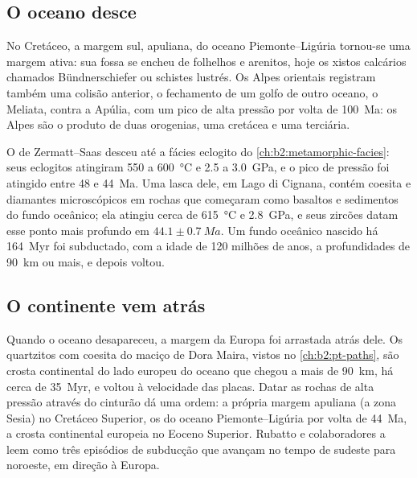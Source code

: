 \subsection*{O oceano desce}

No Cretáceo, a margem sul, apuliana, do oceano Piemonte--Ligúria tornou-se uma
margem ativa: sua fossa se encheu de folhelhos e arenitos, hoje os xistos calcários
chamados Bündnerschiefer ou schistes lustrés. Os Alpes orientais registram também uma colisão
anterior, o fechamento de um golfo de outro oceano, o Meliata, contra a Apúlia, com um
pico de alta pressão por volta de \qty{100}{Ma}: os Alpes são o produto de duas orogenias, uma
cretácea e uma terciária.

O  de Zermatt--Saas desceu até a fácies eclogito do
\cref{ch:b2:metamorphic-facies}: seus eclogitos atingiram 550 a \qty{600}{\celsius} e 2.5 a
\qty{3.0}{GPa}, e o pico de pressão foi atingido entre 48 e \qty{44}{Ma}. Uma lasca dele,
em Lago di Cignana, contém coesita e diamantes microscópicos em rochas que começaram como basaltos
e sedimentos do fundo oceânico; ela atingiu cerca de \qty{615}{\celsius} e \qty{2.8}{GPa}, e seus
zircões datam esse ponto mais profundo em $44.1 \pm \qty{0.7}{Ma}$. Um fundo oceânico nascido
há \qty{164}{Myr} foi subductado, com a idade de 120 milhões de anos, a profundidades de
\qty{90}{km} ou mais, e depois voltou.

\subsection*{O continente vem atrás}

Quando o oceano desapareceu, a margem da Europa foi arrastada atrás dele. Os quartzitos com
coesita do maciço de Dora Maira, vistos no \cref{ch:b2:pt-paths}, são crosta continental
do lado europeu do oceano que chegou a mais de \qty{90}{km}, há cerca de
\qty{35}{Myr}, e voltou à velocidade das placas. Datar as rochas de alta pressão
através do cinturão dá uma ordem: a própria margem apuliana (a zona Sesia) no Cretáceo
Superior, os  do oceano Piemonte--Ligúria por volta de \qty{44}{Ma}, a
crosta continental europeia no Eoceno Superior. Rubatto e colaboradores a leem como três episódios de subducção que avançam no tempo de
sudeste para noroeste, em direção à Europa.

